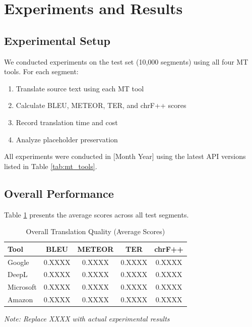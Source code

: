 \section{Experiments and Results}

\subsection{Experimental Setup}

We conducted experiments on the test set (10,000 segments) using all four MT tools. For each segment:

\begin{enumerate}
    \item Translate source text using each MT tool
    \item Calculate BLEU, METEOR, TER, and chrF++ scores
    \item Record translation time and cost
    \item Analyze placeholder preservation
\end{enumerate}

All experiments were conducted in [Month Year] using the latest API versions listed in Table \ref{tab:mt_tools}.

\subsection{Overall Performance}

Table \ref{tab:overall_results} presents the average scores across all test segments.

\begin{table}[h]
\centering
\caption{Overall Translation Quality (Average Scores)}
\label{tab:overall_results}
\begin{tabular}{@{}lcccc@{}}
\toprule
\textbf{Tool} & \textbf{BLEU} & \textbf{METEOR} & \textbf{TER} & \textbf{chrF++} \\ \midrule
Google & 0.XXXX & 0.XXXX & 0.XXXX & 0.XXXX \\
DeepL & 0.XXXX & 0.XXXX & 0.XXXX & 0.XXXX \\
Microsoft & 0.XXXX & 0.XXXX & 0.XXXX & 0.XXXX \\
Amazon & 0.XXXX & 0.XXXX & 0.XXXX & 0.XXXX \\ \bottomrule
\end{tabular}
\end{table}

\textit{Note: Replace XXXX with actual experimental results}

